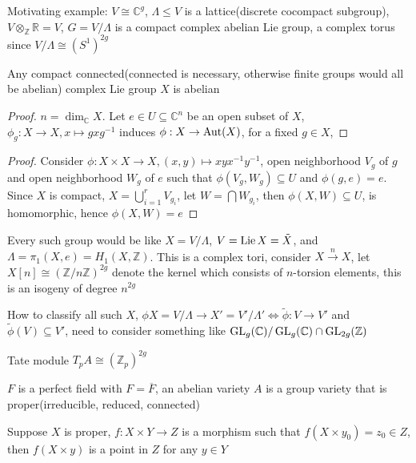 Motivating example: $V\cong\mathbb C^g$, $\Lambda\leq V$ is a lattice(discrete cocompact subgroup), $V\otimes_{\mathbb Z}\mathbb R=V$, $G=V/\Lambda$ is a compact complex abelian Lie group, a complex torus since $V/\Lambda\cong (S^1)^{2g}$

\begin{theorem}
Any compact connected(connected is necessary, otherwise finite groups would all be abelian) complex Lie group $X$ is abelian
\end{theorem}

\begin{proof}
$n=\dim_{\mathbb C}X$. Let $e\in U\subseteq\mathbb C^n$ be an open subset of $X$, $\phi_g:X\to X,x\mapsto gxg^{-1}$ induces $\phi:X\to\operatorname{Aut}(X)$, for a fixed $g\in X$,
\end{proof}

\begin{proof}
Consider $\phi:X\times X\to X,(x,y)\mapsto xyx^{-1}y^{-1}$, open neighborhood $V_g$ of $g$ and open neighborhood $W_g$ of $e$ such that $\phi(V_g,W_g)\subseteq U$ and $\phi(g,e)=e$. Since $X$ is compact, $X=\bigcup_{i=1}^rV_{g_i}$, let $W=\bigcap W_{g_i}$, then $\phi(X,W)\subseteq U$, is homomorphic, hence $\phi(X,W)=e$
\end{proof}

Every such group would be like $X=V/\Lambda$, $V=\operatorname{Lie} X=\tilde X$, and $\Lambda=\pi_1(X,e)=H_1(X,\mathbb Z)$. This is a complex tori, consider $X\xrightarrow nX$, let $X[n]\cong(\mathbb Z/n\mathbb Z)^{2g}$ denote the kernel which consists of $n$-torsion elements, this is an isogeny of degree $n^{2g}$

How to classify all such $X$, $\phi X=V/\Lambda\to X'=V'/\Lambda'\Leftrightarrow \tilde\phi:V\to V'$ and $\tilde \phi(V)\subseteq V'$, need to consider something like $\operatorname{GL}_g(\mathbb C)/\operatorname{GL}_g(\mathbb C)\cap\operatorname{GL}_{2g}(\mathbb Z)$

Tate module $T_pA\cong(\mathbb Z_p)^{2g}$

\begin{definition}
$F$ is a perfect field with $F=\overline F$, an abelian variety $A$ is a group variety that is proper(irreducible, reduced, connected)
\end{definition}

\begin{lemma}[Rigidity]\label{Rigidity lemma}
Suppose $X$ is proper, $f:X\times Y\to Z$ is a morphism such that $f(X\times y_0)=z_0\in Z$, then $f(X\times y)$ is a point in $Z$ for any $y\in Y$
\end{lemma}

